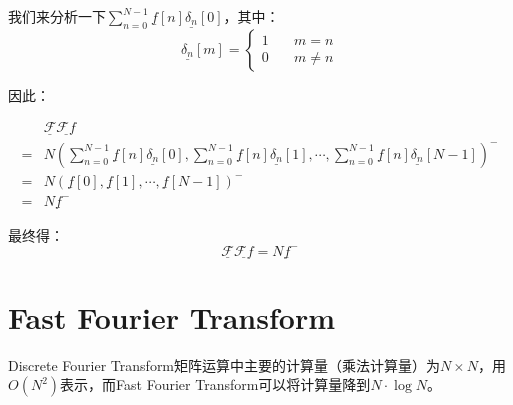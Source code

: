 我们来分析一下$\sum_{n=0}^{N-1}\underline{f}[n]\underline{\delta_n}[0]$，其中：
$$
	\underline{\delta_n}[m]=\begin{cases} 1 & \quad m=n     \\
		0 & \quad m\neq n\end{cases}
$$

因此：

\begin{align*}
	  & \underline{\mathcal{F}}\underline{\mathcal{F}f}                                                                                                                                                  \\
	= & N\left(\sum_{n=0}^{N-1}\underline{f}[n]\underline{\delta_n}[0],\sum_{n=0}^{N-1}\underline{f}[n]\underline{\delta_n}[1],\cdots,\sum_{n=0}^{N-1}\underline{f}[n]\underline{\delta_n}[N-1]\right)^- \\
	= & N\left(\underline{f}[0],\underline{f}[1],\cdots,\underline{f}[N-1]\right )^-                                                                                                                     \\
	= & N\underline{f}^-
\end{align*}

最终得：
\begin{equation}
	\underline{\mathcal{F}}\underline{\mathcal{F}f} = N\underline{f}^-
\end{equation}

\section{Fast Fourier Transform}
Discrete Fourier Transform矩阵运算中主要的计算量（乘法计算量）为$N \times N$，用$O(N^2)$表示，而Fast Fourier Transform可以将计算量降到$N\cdot \log{N}$。
